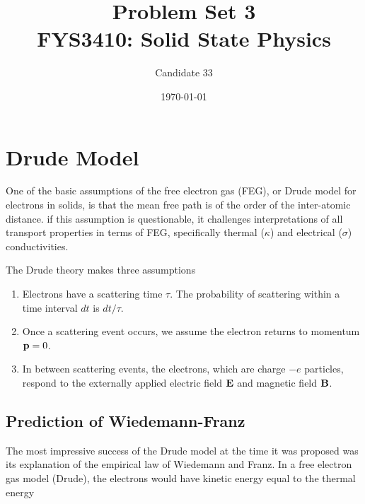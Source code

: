 \documentclass[11pt]{amsart}
\title[Problem Set 3]{Problem Set 3 \\
		\hrulefill \small{ FYS3410: Solid State Physics } \hrulefill}
\author{Candidate 33}
\date{\today}
\begin{document}
\maketitle

\section{Drude Model}
One of the basic assumptions of the free electron gas (FEG), or Drude model for electrons in solids, is that the mean free path is of the order of the inter-atomic distance. if this  assumption is questionable, it challenges interpretations of all transport properties in terms of FEG, specifically thermal ($\kappa$) and electrical ($\sigma$) conductivities.

The Drude theory makes three assumptions
\begin{enumerate}
\item Electrons have a scattering time $\tau$. The probability of scattering within a time interval $dt$ is $dt/\tau$.
\item Once a scattering event occurs, we assume the electron returns to momentum $\vb{p} = 0$.
\item In between scattering events, the electrons, which are charge $-e$ particles, respond to the externally applied electric field $\vb{E}$ and magnetic field $\vb{B}$.
\end{enumerate}
 


\subsection{Prediction of Wiedemann-Franz}
The most impressive success of the Drude model at the time it was proposed was its explanation of the empirical law of Wiedemann and Franz. In a free electron gas model (Drude), the electrons would have kinetic energy equal to the thermal energy
\end{document}
